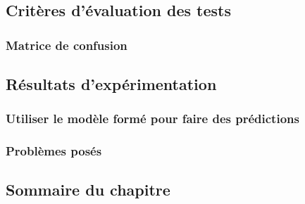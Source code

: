 	\subsection{Critères d'évaluation des tests}
	\lipsum[1] 
	\subsubsection{Matrice de confusion}
	\lipsum[1] 
	\subsection{Résultats d'expérimentation}
	\subsubsection{Utiliser le modèle formé pour faire des prédictions}
	\lipsum[1] 
	\subsubsection{Problèmes posés}
	\lipsum[1] 
	\subsection{Sommaire du chapitre}
	\lipsum[1] 
	\lipsum[1] 
	\lipsum[1] 
	

